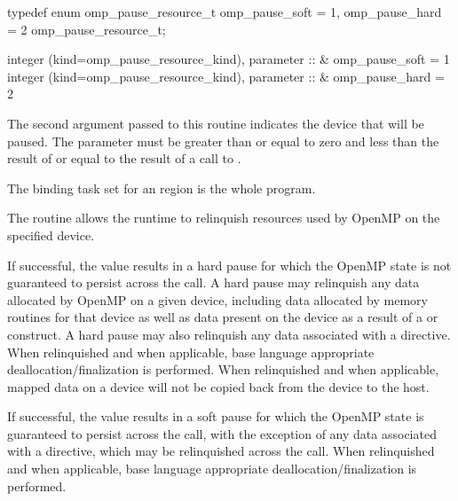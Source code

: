 \begin{samepage}
\format
\begin{ccppspecific}
\begin{ompcFunction}
typedef enum omp_pause_resource_t {
  omp_pause_soft = 1,
  omp_pause_hard = 2
} omp_pause_resource_t;
\end{ompcFunction}
\end{ccppspecific}
\end{samepage}

\begin{fortranspecific}
\begin{ompfFunction}
integer (kind=omp_pause_resource_kind), parameter :: &
  omp_pause_soft = 1
integer (kind=omp_pause_resource_kind), parameter :: &
  omp_pause_hard = 2
\end{ompfFunction}
\end{fortranspecific}

The second argument passed to this routine indicates the device that 
will be paused. The  parameter must be greater than or 
equal to zero and less than the result of 
or equal to the result of a call to .

\binding

The binding task set for an  region is the whole program.

\effect
The  routine allows the runtime to relinquish 
resources used by OpenMP on the specified device.

If successful, the  value results in a hard pause 
for which the OpenMP state is not guaranteed to persist across the 
 call. A hard pause may relinquish any data 
allocated by OpenMP on a given device, including data allocated by 
memory routines for that device as well as data present on the device 
as a result of a  or  construct.
A hard pause may also relinquish any data associated with a 
 directive. When relinquished and when applicable, 
base language appropriate deallocation/finalization is performed. 
When relinquished and when applicable, mapped data on a device will 
not be copied back from the device to the host.

If successful, the  value results in a soft 
pause for which the OpenMP state is guaranteed to persist across 
the call, with the exception of any data associated with a  
 directive, which may be relinquished across 
the call. When relinquished and when applicable, base language 
appropriate deallocation/finalization is performed. 

